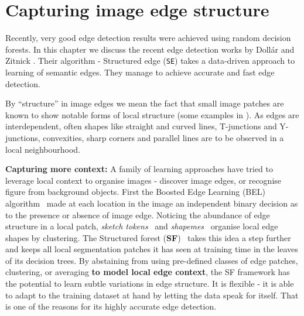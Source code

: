 \chapter{Capturing image edge structure} %
\label{Chapter2}
Recently, very good edge detection results were achieved using random decision forests. In this chapter we discuss the recent edge detection works by Doll\'ar and Zitnick \cite{DollarICCV13edges,Dollar2015PAMI}. Their algorithm - Structured edge ({\tt SE}) takes a data-driven approach to learning of semantic edges. %
They manage to achieve accurate and fast edge detection. %

By ``structure'' in image edges %
we mean the fact that small %
image patches are known \cite{Ren2006figure,LimZD13} to show %
notable %
forms of local structure (some examples in ). As edges are interdependent, often shapes like straight and curved lines, T-junctions and Y-junctions, convexities, sharp corners and parallel lines are to be observed in a local neighbourhood.

\textbf{Capturing more context:} A family of learning approaches have tried to leverage local context to organise images - discover image edges, or recognise %
figure from background objects. First the Boosted Edge Learning (BEL) algorithm~\cite{Dollar2006supervised} made at each location in the image an independent binary decision as to the presence or absence of image edge. Noticing the abundance of edge structure in a local patch, \textit{sketch tokens}~\cite{LimZD13} and \textit{shapemes}~\cite{Ren2006figure} organise local edge shapes by clustering. 
The Structured forest ({\bf SF})~\cite{DollarICCV13edges} takes this idea a step further and keeps all local segmentation patches it has seen at training time in the leaves of its decision trees. By abstaining from using pre-defined classes of edge patches, clustering, or averaging \textbf{to model local edge context}, the SF framework has the potential to learn subtle variations in edge structure. It is flexible - it is able to adapt to the training dataset at hand by letting the data speak for itself. That is one of the reasons for its highly accurate edge detection.

